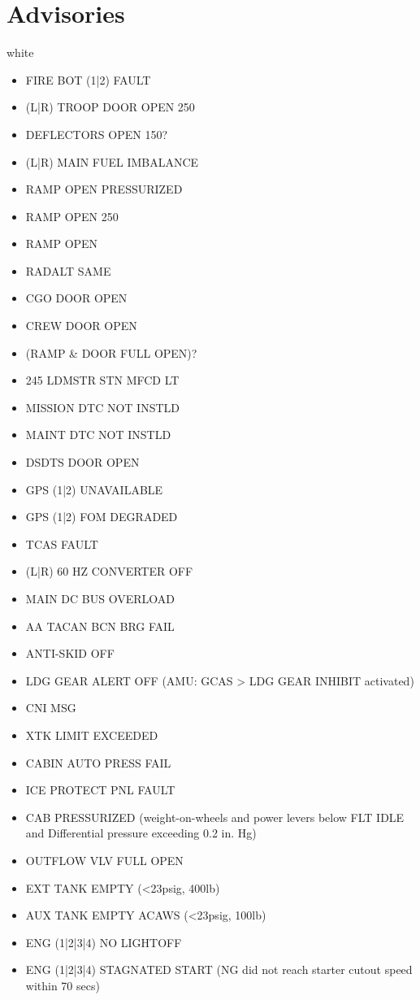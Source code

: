 \section{Advisories}
white

\begin{itemize}
\item FIRE BOT (1|2) FAULT
\item (L|R) TROOP DOOR OPEN 250
\item DEFLECTORS OPEN 150?
\item (L|R) MAIN FUEL IMBALANCE
\item RAMP OPEN PRESSURIZED
\item RAMP OPEN 250
\item RAMP OPEN
\item RADALT SAME
\item CGO DOOR OPEN
\item CREW DOOR OPEN
\item (RAMP \& DOOR FULL OPEN)?
\item 245 LDMSTR STN MFCD LT
\item MISSION DTC NOT INSTLD
\item MAINT DTC NOT INSTLD
\item DSDTS DOOR OPEN
\item GPS (1|2) UNAVAILABLE
\item GPS (1|2) FOM DEGRADED
\item TCAS FAULT
\item (L|R) 60 HZ CONVERTER OFF
\item MAIN DC BUS OVERLOAD
\item AA TACAN BCN BRG FAIL
\item ANTI-SKID OFF
\item LDG GEAR ALERT OFF (AMU: GCAS > LDG GEAR INHIBIT activated)
\item CNI MSG
\item XTK LIMIT EXCEEDED
\item CABIN AUTO PRESS FAIL
\item ICE PROTECT PNL FAULT
\item CAB PRESSURIZED (weight-on-wheels and power levers below FLT IDLE and Differential pressure exceeding 0.2 in. Hg)
\item OUTFLOW VLV FULL OPEN
\item EXT TANK EMPTY (<23psig, 400lb)
\item AUX TANK EMPTY ACAWS (<23psig, 100lb)
\item ENG (1|2|3|4) NO LIGHTOFF
\item ENG (1|2|3|4) STAGNATED START (NG did not reach starter cutout speed within 70 secs)

\end{itemize}
